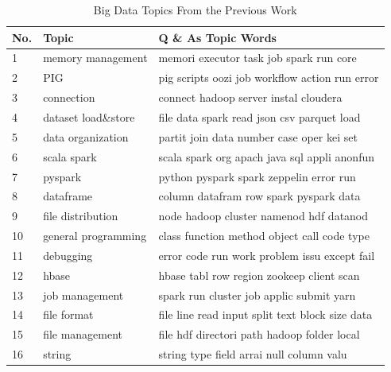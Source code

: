 \begin{table}[tbp]
\caption{Big Data Topics From the Previous Work \cite{bagherzadeh2019going}}
\centering
\label{tab:BT}
\begin{tabular}{p{.15in}p{2.25in}p{3.1in}}\hline
\textbf{No.}&\textbf{Topic}&\textbf{Q \& As Topic Words}\\ \hline
1&memory management & 
memori executor task job spark run core\\ 

2&PIG& 
pig scripts oozi job workflow action run error\\ 

3&connection& 
connect hadoop server instal cloudera\\ 

4&dataset load\&store & 
file data spark read json csv parquet load\\ 

5&data organization& 
partit join data number case oper kei set\\ 

6&scala spark& 
scala spark org apach java sql appli anonfun\\ 

7&pyspark& 
python pyspark spark zeppelin error run\\ 

8&dataframe& 
column datafram row spark pyspark data\\ 

9&file distribution& 
node hadoop cluster namenod hdf datanod\\

10&general programming& 
class function method object call code type\\ 

11&debugging& 
error code run work problem issu except fail\\ 

12&hbase& 
hbase tabl row region zookeep client scan\\ 

13&job management& 
spark run cluster job applic submit yarn\\ 

14&file format& 
file line read input split text block size data\\

15&file management& 
file hdf directori path hadoop folder local\\ 

16&string& 
string type field arrai null column valu\\ 


\end{tabular}
\end{table}
